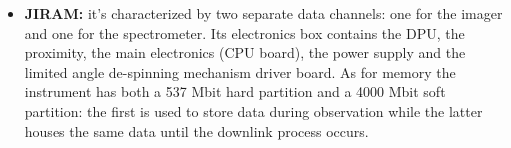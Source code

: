 \begin{itemize}
    \item \textbf{JIRAM:} it's characterized by two separate data channels: one for the imager and one for the spectrometer. Its electronics box contains the DPU, the proximity, the main electronics (CPU board), the power supply and the limited angle de-spinning mechanism driver board. \cite{JIRAM_info} As for memory the instrument has both a 537 Mbit hard partition and a 4000 Mbit soft partition: the first is used to store data during observation while the latter houses the same data until the downlink process occurs. \cite{JIRAM_info_2}      
\end{itemize}